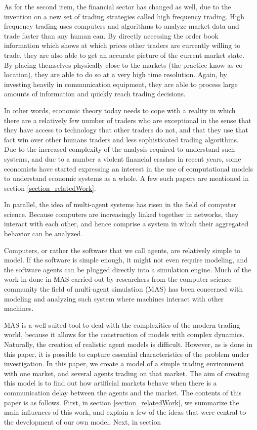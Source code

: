 As for the second item, the financial sector has changed as well, due to the invention on a new set of trading strategies called high frequency trading. High frequency trading uses computers and algorithms to analyze market data and trade faster than any human can. By directly accessing the order book information which shows at which prices other traders are currently willing to trade, they are also able to get an accurate picture of the current market state. By placing themselves physically close to the markets (the practice know as co-location), they are able to do so at a very high time resolution. Again, by investing heavily in communication equipment, they are able to process large amounts of information and quickly reach trading decisions.

In other words, economic theory today needs to cope with a reality in which there are a relatively few number of traders who are exceptional in the sense that they have access to technology that other traders do not, and that they use that fact win over other humans traders and less sophisticated trading algorithms. Due to the increased complexity of the analysis required to understand such systems, and due to a number a violent financial crashes in recent years, some economists have started expressing an interest in the use of computational models to understand economic systems as a whole. A few such papers are mentioned in section \ref{section_relatedWork}.

In parallel, the idea of multi-agent systems has risen in the field of computer science. Because computers are increasingly linked together in networks, they interact with each other, and hence comprise a system in which their aggregated behavior can be analyzed. 

Computers, or rather the software that we call agents, are relatively simple to model. If the software is simple enough, it might not even require modeling, and the software agents can be plugged directly into a simulation engine. Much of the work in done in MAS carried out by researchers from the computer science community the field of multi-agent simulation (MAS) has been concerned with modeling and analyzing such system where machines interact with other machines. 
 
MAS is a well suited tool to deal with the complexities of the modern trading world, because it allows for the construction of models with complex dynamics. Naturally, the creation of realistic agent models is difficult. However, as is done in this paper, it is possible to capture essential characteristics of the problem under investigation. In this paper, we create a model of a simple trading environment with one market, and several agents trading on that market. The aim of creating this model is to find out how artificial markets behave when there is a communication delay between the agents and the market. The contents of this paper is as follows. First, in section \ref{section_relatedWork}, we summarize the main influences of this work, and explain a few of the ideas that were central to the development of our own model. Next, in section 

